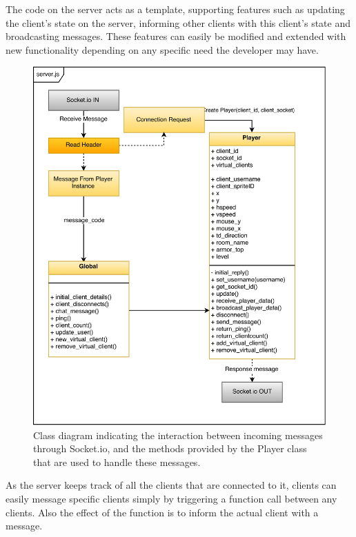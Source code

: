 \documentclass[bsc, 12pt, twoside, singlespacing, parskip, abbrevs, notimes, normalheadings, logo]{styles/infthesis}
\begin{document}
The code on the server acts as a template, supporting features such as updating the client's state on the server, informing other clients with this client's state and broadcasting messages. These features can easily be modified and extended with new functionality depending on any specific need the developer may have.

\begin{figure}[H]
\includegraphics[scale=1]{images/server_class_diagram.eps}
\caption{Class diagram indicating the interaction between incoming messages through Socket.io, and the methods provided by the Player class that are used to handle these messages.}
\label{fig:server_class_diagram}
\vspace{1em}
\end{figure}

As the server keeps track of all the clients that are connected to it, clients can easily message specific clients simply by triggering a function call between any clients. Also the effect of the function is to inform the actual client with a message.
\end{document}
